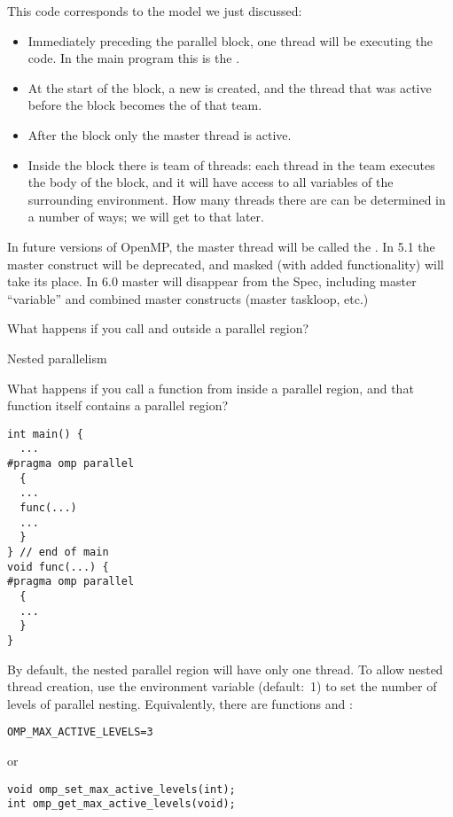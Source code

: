 This code corresponds to the model we just discussed:
\begin{itemize}
\item Immediately preceding the parallel block, one thread will be
  executing the code.
  In the main program this is the .
\item At the start of the block, a new  is
  created, and the thread that was active before the block
  becomes the  of that team.
\item After the block only the master thread is active.
\item Inside the block there is team of threads: each thread in the
  team executes the body of the block, and it will have access to all
  variables of the surrounding environment.
  How many
  threads there are can be determined in a number of ways; we will get to that later.
\end{itemize}

\begin{remark}
  In future versions of OpenMP, the master thread will be called
  the .
  In 5.1 the master construct will be deprecated, and masked (with
  added functionality) will take its place.  In 6.0 master will
  disappear from the Spec, including  master “variable”
  and combined master constructs (master taskloop, etc.)
\end{remark}

\begin{exercise}
  What happens if you call  and 
  outside a parallel region?
\end{exercise}

 {Nested parallelism}
\label{sec:omp-levels}

What happens if you call a function from inside a parallel region, and
that function itself contains a parallel region?
\begin{lstlisting}
int main() {
  ...
#pragma omp parallel
  {
  ...
  func(...)
  ...
  }
} // end of main
void func(...) {
#pragma omp parallel
  {
  ...
  }
}
\end{lstlisting}

By default, the nested parallel region will have only one thread.
To allow nested thread creation,
use the environment variable
 (default:~1)
to set the number of levels of parallel nesting.
Equivalently, there are functions
 and :
\begin{verbatim}
OMP_MAX_ACTIVE_LEVELS=3
\end{verbatim}
or
\begin{lstlisting}
void omp_set_max_active_levels(int);
int omp_get_max_active_levels(void);
\end{lstlisting}

